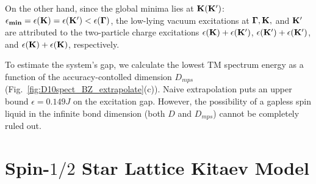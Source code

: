 \documentclass{ntuthesis}
\begin{document}
On the other hand, since the global minima lies at $\bold{K} (\bold{K'})$: $\epsilon_\textbf{min} = \epsilon(\bold{K}) = \epsilon(\bold{K'}) <  \epsilon(\boldsymbol{ \Gamma})$, the low-lying vacuum excitations at  $\boldsymbol{\Gamma}, \bold{K},$ and $\bold{K'}$ are attributed to the two-particle charge excitations $\epsilon(\bold{K}) + \epsilon(\bold{K'})$, $\epsilon(\bold{K'}) + \epsilon(\bold{K'})$, and $\epsilon(\bold{K}) + \epsilon(\bold{K})$, respectively.

To estimate the system's gap, we calculate the lowest TM spectrum energy as a function of the accuracy-contolled dimension $D_{mps}$ (Fig.~\ref{fig:D10spect_BZ_extrapolate}(c)). Naive extrapolation puts an upper bound $\epsilon = 0.149J$ on the excitation gap. However, the possibility of a gapless spin liquid in the infinite bond dimension (both $D$ and $D_{mps}$) cannot be completely ruled out.  
\section{Spin-$1/2$ Star Lattice Kitaev Model}
\label{sec:star_lattice}
\end{document}
